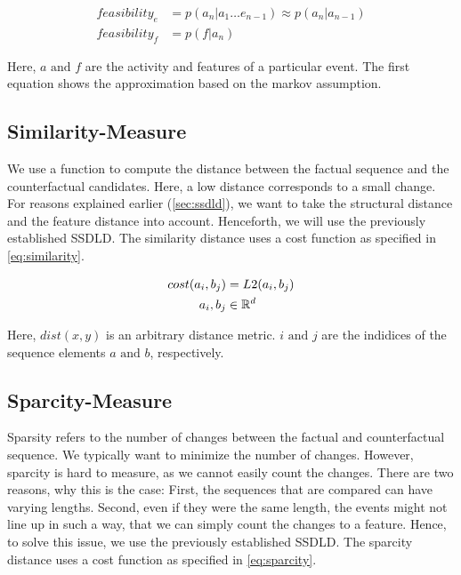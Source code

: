 \documentclass[./../../paper.tex]{subfiles}
\begin{document}
\begin{align}
    \label{eq:feasibility}
    feasibility_e & =p(a_n|a_1\ldots e_{n-1}) \approx  p(a_n|a_{n-1}) \\
    feasibility_f & =p(f|a_n)
\end{align}

\noindent Here, $a \text{ and } f$ are the activity and features of a particular event. The first equation shows the approximation based on the markov assumption.

\subsection{Similarity-Measure}
We use a function to compute the distance between the factual sequence and the counterfactual candidates. Here, a low distance corresponds to a small change. For reasons explained earlier (\autoref{sec:ssdld}), we want to take the structural distance and the feature distance into account. Henceforth, we will use the previously established \gls{SSDLD}. 
The similarity distance uses a cost function as specified in \autoref{eq:similarity}.

\begin{align}
    \label{eq:similarity}
    cost(a_i, b_j)      & = L2(a_i, b_j) \\
    a_i,b_j        & \in \mathbb{R}^d \nonumber
\end{align}

\noindent Here, $dist(x,y)$ is an arbitrary distance metric. $i \text{ and } j$ are the indidices of the sequence elements $a \text{ and } b$, respectively.

\subsection{Sparcity-Measure}
Sparsity refers to the number of changes between the factual and counterfactual sequence. We typically want to minimize the number of changes. However, sparcity is hard to measure, as we cannot easily count the changes. There are two reasons, why this is the case: First, the sequences that are compared can have varying lengths. Second, even if they were the same length, the events might not line up in such a way, that we can simply count the changes to a feature. Hence, to solve this issue, we use the previously established \gls{SSDLD}. The sparcity distance uses a cost function as specified in \autoref{eq:sparcity}.
\end{document}
